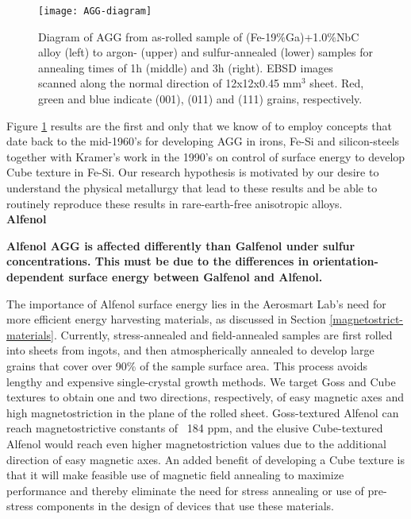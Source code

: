 \begin{figure}[h] 
	\centering
	\texttt{[image: AGG-diagram]}
	\caption{Diagram of AGG from as-rolled sample of (Fe-19$\%$Ga)+1.0$\%$NbC alloy (left) to argon- (upper) and sulfur-annealed (lower) samples for annealing times of 1h (middle) and 3h (right). EBSD images scanned along the normal direction of 12x12x0.45 mm$^{3}$ sheet. Red, green and blue indicate \hkl(001), \hkl(011) and \hkl(111) grains, respectively. 
	}
	\label{fig:AGG-diagram}		
\end{figure}

Figure \ref{fig:AGG-diagram} results are the first and only that we know of to employ concepts that date back to the mid-1960’s \cite{Walter1965,dunn1962surface,waeckerle1993effect} for developing AGG in irons, Fe-Si and silicon-steels together with Kramer’s work in the 1990’s\cite{Kramer1992} on control of surface energy to develop Cube texture in Fe-Si. Our research hypothesis is motivated by our desire to understand the physical metallurgy that lead to these results and be able to routinely reproduce these results in rare-earth-free anisotropic alloys. \\
\textbf{Alfenol}

\textbf{Alfenol AGG is affected differently than Galfenol under sulfur concentrations. This must be due to the differences in orientation-dependent surface energy between Galfenol and Alfenol.}


The importance of Alfenol surface energy lies in the Aerosmart Lab's need for more efficient energy harvesting materials, as discussed in Section \ref{magnetostrict-materials}. Currently, stress-annealed and field-annealed samples are first rolled into sheets from ingots, and then atmospherically annealed to develop large grains that cover over 90\% of the sample surface area. This process avoids lengthy and expensive single-crystal growth methods. We target Goss  and Cube  textures to obtain one and two directions, respectively, of easy magnetic axes and high magnetostriction in the plane of the rolled sheet. Goss-textured Alfenol can reach magnetostrictive constants of ~184 ppm, and the elusive Cube-textured Alfenol would reach even higher magnetostriction values due to the additional direction of easy magnetic axes. An added benefit of developing a Cube texture is that it will make feasible use of magnetic field annealing to maximize performance\cite{Yoo2009,Yoo2008} and thereby eliminate the need for stress annealing or use of pre-stress components in the design of devices that use these materials\cite{Restorff2006,Summers2009}.
	
